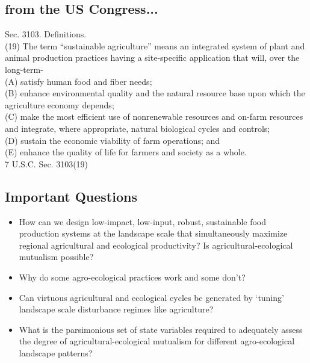 \documentclass[
paper=128mm:96mm, %
fontsize=11pt, %
pagesize, %
parskip=half-, %
]{scrartcl}
\theoremstyle{mythmstyle} %
\begin{document}
\clearpage

\subsection{from the US Congress...}
\footnotesize {
Sec. 3103. Definitions.\\
(19) The term \enquote{sustainable agriculture} means an integrated system of plant and animal production
practices having a site-specific application that will, over the long-term-\\
(A) satisfy human food and fiber needs;\\
(B) enhance environmental quality and the natural resource base upon which the agriculture economy
depends;\\
(C) make the most efficient use of nonrenewable resources and on-farm resources and integrate, where
appropriate, natural biological cycles and controls;\\
(D) sustain the economic viability of farm operations; and\\
(E) enhance the quality of life for farmers and society as a whole.\\
7 U.S.C. Sec. 3103(19)
}

\clearpage




\subsection{Important Questions}    
\begin{itemize}
\item How can we design low-impact, low-input, robust, sustainable food production systems at the landscape scale that simultaneously maximize regional agricultural and ecological productivity? Is agricultural-ecological mutualism possible?
\item Why do some agro-ecological practices work and some don't?
\item Can virtuous agricultural and ecological cycles be generated by \enquote*{tuning} landscape scale disturbance regimes like agriculture?
\item What is the parsimonious set of state variables required to adequately assess the degree of agricultural-ecological mutualism for different agro-ecological landscape patterns?
\end{itemize}
\clearpage
\end{document}
